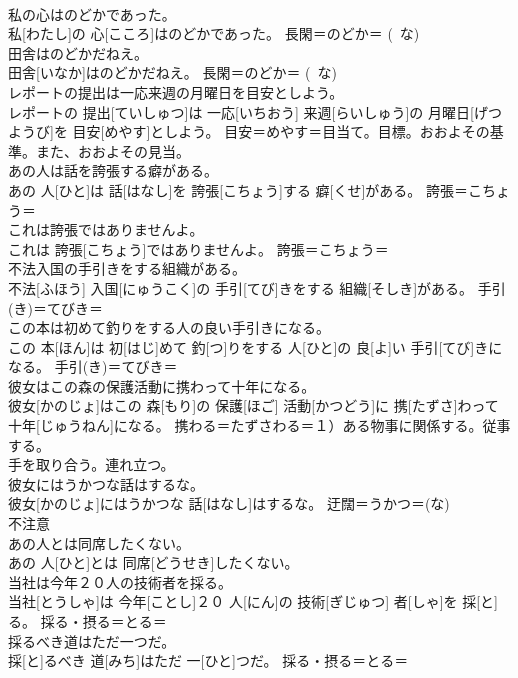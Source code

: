 \documentclass[8pt]{extreport}
\begin{document}
\begin{CJK}{UTF8}{min}
\\	私の心はのどかであった。	
\\	私[わたし]の 心[こころ]はのどかであった。	長閑＝のどか＝ (~な) 
\\	田舎はのどかだねえ。	
\\	田舎[いなか]はのどかだねえ。	長閑＝のどか＝ (~な) 
\\	レポートの提出は一応来週の月曜日を目安としよう。	
\\	レポートの 提出[ていしゅつ]は 一応[いちおう] 来週[らいしゅう]の 月曜日[げつようび]を 目安[めやす]としよう。	目安＝めやす＝目当て。目標。おおよその基準。また、おおよその見当。
\\	あの人は話を誇張する癖がある。	
\\	あの 人[ひと]は 話[はなし]を 誇張[こちょう]する 癖[くせ]がある。	誇張＝こちょう＝ 
\\	これは誇張ではありませんよ。	
\\	これは 誇張[こちょう]ではありませんよ。	誇張＝こちょう＝ 
\\	不法入国の手引きをする組織がある。	
\\	不法[ふほう] 入国[にゅうこく]の 手引[てび]きをする 組織[そしき]がある。	手引(き)＝てびき＝ 
\\	この本は初めて釣りをする人の良い手引きになる。	
\\	この 本[ほん]は 初[はじ]めて 釣[つ]りをする 人[ひと]の 良[よ]い 手引[てび]きになる。	手引(き)＝てびき＝ 
\\	彼女はこの森の保護活動に携わって十年になる。	
\\	彼女[かのじょ]はこの 森[もり]の 保護[ほご] 活動[かつどう]に 携[たずさ]わって 十年[じゅうねん]になる。	携わる＝たずさわる＝１）ある物事に関係する。従事する。 　　　　　　　　　　
\\	手を取り合う。連れ立つ。
\\	彼女にはうかつな話はするな。	
\\	彼女[かのじょ]にはうかつな 話[はなし]はするな。	迂闊＝うかつ＝(な) 
\\	不注意
\\	あの人とは同席したくない。	
\\	あの 人[ひと]とは 同席[どうせき]したくない。	
\\	当社は今年２０人の技術者を採る。	
\\	当社[とうしゃ]は 今年[ことし]２０ 人[にん]の 技術[ぎじゅつ] 者[しゃ]を 採[と]る。	採る・摂る＝とる＝ 
\\	採るべき道はただ一つだ。	
\\	採[と]るべき 道[みち]はただ 一[ひと]つだ。	採る・摂る＝とる＝ 

\end{CJK}
\end{document}
